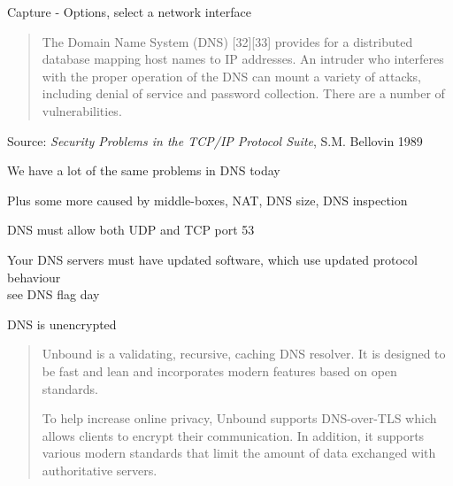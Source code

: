 \documentclass[Screen16to9,17pt]{foils}
\begin{document}


\centerline{Capture - Options, select a network interface}
\centerline{}




\begin{quote}
The Domain Name System (DNS) [32][33] provides for a distributed database mapping host names to IP
addresses. An intruder who interferes with the proper operation of the DNS can mount a variety of
attacks, including denial of service and password collection. There are a number of vulnerabilities.
\end{quote}
Source: \emph{Security Problems in the TCP/IP Protocol Suite}, S.M. Bellovin 1989\\

\begin{list1}
\item We have a lot of the same problems in DNS today
\item Plus some more caused by middle-boxes, NAT, DNS size, DNS inspection
\begin{list2}
\item DNS must allow both UDP and TCP port 53
\item Your DNS servers must have updated software, which use updated protocol behaviour \\
see DNS flag day 
\item DNS is unencrypted
\end{list2}
\end{list1}


\begin{quote}
Unbound is a validating, recursive, caching DNS resolver. It is designed to be fast and lean and incorporates modern features based on open standards.

To help increase online privacy, Unbound supports DNS-over-TLS which allows clients to encrypt their communication. In addition, it supports various modern standards that limit the amount of data exchanged with authoritative servers.
\end{quote}

\end{document}
